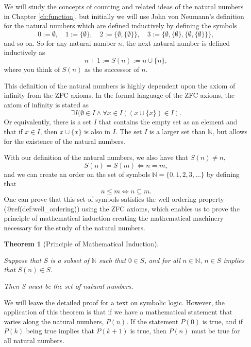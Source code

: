 \documentclass[
]{book}
\newtheorem{theorem}{Theorem}[chapter]
\theoremstyle{definition}
\theoremstyle{definition}
\theoremstyle{definition}
\theoremstyle{definition}
\theoremstyle{remark}
\begin{document}
We will study the concepts of counting and related ideas of the natural numbers in Chapter \ref{ch:function}, but initially we will use John von Neumann's \citeyearpar{vonNeumann23} definition for the natural numbers which are defined inductively by defining the symbols
\[0:=\emptyset, \quad 1:=\{\emptyset\}, \quad 2:=\{\emptyset, \{\emptyset\}\}, \quad 3:=\{\emptyset, \{\emptyset\}, \{\emptyset, \{\emptyset\} \}\},\] and so on. So for any natural number \(n\), the next natural number is defined inductively as \[n+1:=S(n) := n\cup \{n\},\] where you think of \(S(n)\) as the successor of \(n\).

This definition of the natural numbers is highly dependent upon the axiom of infinity from the ZFC axioms. In the formal language of the ZFC axioms, the axiom of infinity is stated as
\[\exists I ( \emptyset\in I \wedge \forall x\in I((x\cup \{x\})\in I).\] Or equivalently, there is a set \(I\) that contains the empty set as an element and that if \(x\in I\), then \(x\cup \{x\}\) is also in \(I\). The set \(I\) is a larger set than \(\mathbb{N}\), but allows for the existence of the natural numbers.

With our definition of the natural numbers, we also have that \(S(n)\neq n\), \[S(n)=S(m) \Leftrightarrow n=m,\] and we can create an order on the set of symbols \(\mathbb{N} = \{0, 1, 2, 3, \ldots \}\) by defining that
\[n \leq m \Longleftrightarrow n \subseteq m.\] One can prove that this set of symbols satisfies the well-ordering property (@ref(def:well\_ordering)) using the ZFC axioms, which enables us to prove the principle of mathematical induction creating the mathematical machinery necessary for the study of the natural numbers.

\begin{theorem}[Principle of Mathematical Induction]
\protect\hypertarget{thm:unlabeled-div-28}{}\label{thm:unlabeled-div-28}

Suppose that \(S\) is a subset of \(\mathbb{N}\) such that \(0\in S\), and for all \(n\in \mathbb{N}\), \(n\in S\) implies that \(S(n) \in S\).

Then \(S\) must be the set of natural numbers.

\end{theorem}

We will leave the detailed proof for a text on symbolic logic. However, the application of this theorem is that if we have a mathematical statement that varies along the natural numbers, \(P(n)\). If the statement \(P(0)\) is true, and if \(P(k)\) being true implies that \(P(k+1)\) is true, then \(P(n)\) must be true for all natural numbers.
\end{document}
